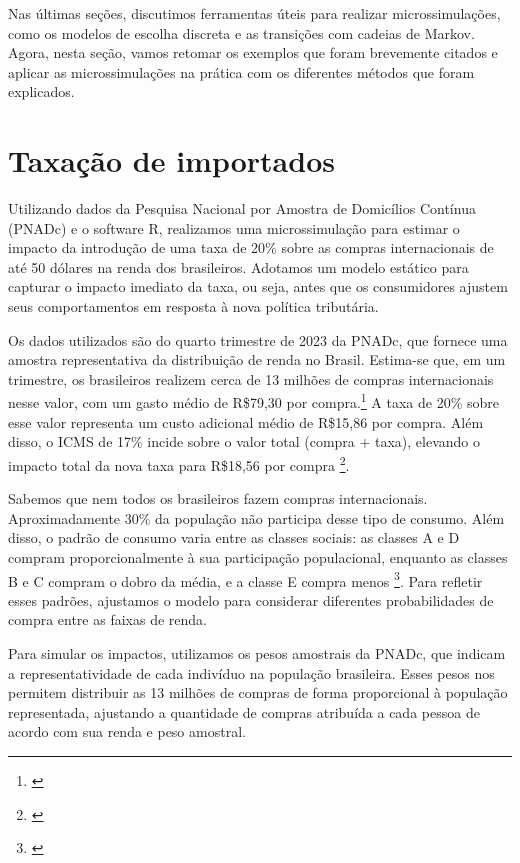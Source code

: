 \documentclass[12pt, a4paper, openany]{book}
\numberwithin{equation}{chapter}
\numberwithin{table}{chapter}
\numberwithin{figure}{chapter}
\theoremstyle{break}
\begin{document}
Nas últimas seções, discutimos ferramentas úteis para realizar microssimulações, como os modelos de escolha discreta e as transições com cadeias de Markov. Agora, nesta seção, vamos retomar os exemplos que foram brevemente citados e aplicar as microssimulações na prática com os diferentes métodos que foram explicados.

\section{Taxação de importados}
\label{sec: exemplo_1}

Utilizando dados da Pesquisa Nacional por Amostra de Domicílios Contínua (PNADc) e o software R, realizamos uma microssimulação para estimar o impacto da introdução de uma taxa de 20\% sobre as compras internacionais de até 50 dólares na renda dos brasileiros. Adotamos um modelo estático para capturar o impacto imediato da taxa, ou seja, antes que os consumidores ajustem seus comportamentos em resposta à nova política tributária.

Os dados utilizados são do quarto trimestre de 2023 da PNADc, que fornece uma amostra representativa da distribuição de renda no Brasil. Estima-se que, em um trimestre, os brasileiros realizem cerca de 13 milhões de compras internacionais nesse valor, com um gasto médio de R\$79,30 por compra.\footnote{\textcite{folha_remessas}} A taxa de 20\% sobre esse valor representa um custo adicional médio de R\$15,86 por compra. Além disso, o ICMS de 17\% incide sobre o valor total (compra + taxa), elevando o impacto total da nova taxa para R\$18,56 por compra \footnote{\textcite{g1_comprasinter}}.

Sabemos que nem todos os brasileiros fazem compras internacionais. Aproximadamente 30\% da população não participa desse tipo de consumo. Além disso, o padrão de consumo varia entre as classes sociais: as classes A e D compram proporcionalmente à sua participação populacional, enquanto as classes B e C compram o dobro da média, e a classe E compra menos \footnote{\textcite{insights_shein}}. Para refletir esses padrões, ajustamos o modelo para considerar diferentes probabilidades de compra entre as faixas de renda.

Para simular os impactos, utilizamos os pesos amostrais da PNADc, que indicam a representatividade de cada indivíduo na população brasileira. Esses pesos nos permitem distribuir as 13 milhões de compras de forma proporcional à população representada, ajustando a quantidade de compras atribuída a cada pessoa de acordo com sua renda e peso amostral.
\end{document}
